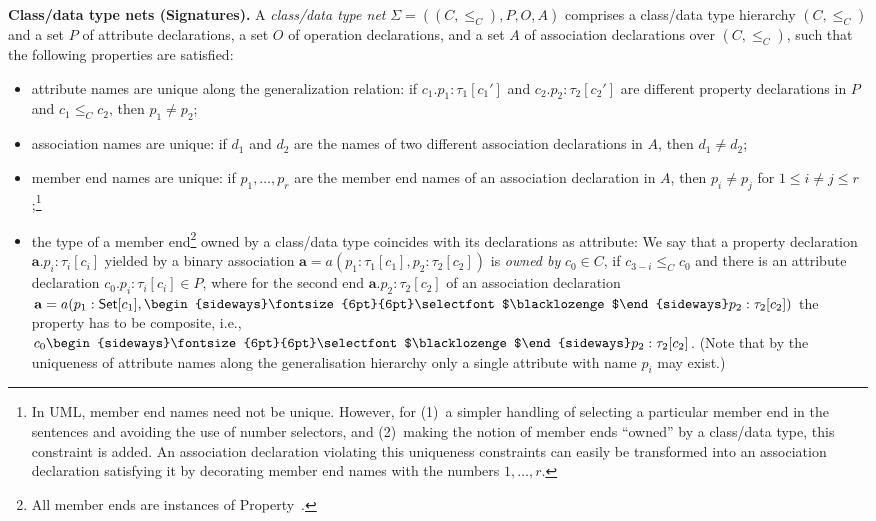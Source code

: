 \documentclass[10pt, a4paper]{isov2}
\newcommand{\uml}[1]{\textsf{#1}}
\newcommand{\composition}{\raisebox{0.2pt}{\begin{sideways}\fontsize{6pt}{6pt}\selectfont$\blacklozenge$\end{sideways}}}
\begin{document}
\medskip\noindent\textbf{Class/data type nets (Signatures).}
A \emph{class/data type net} $\Sigma = ((C, {\leq_C}), P, O, A)$
comprises a class/data type hierarchy $(C, {\leq_C})$ and a set $P$ of
attribute declarations, a set $O$ of operation declarations,
 and a set $A$ of association declarations over
$(C, {\leq_C})$, such that
the following properties are satisfied:
%
\begin{itemize}[label={--}, leftmargin=*]
  \item attribute names are unique along the generalization relation: if
$c_1.p_1 : \tau_1[c_1']$ and $c_2.p_2 : \tau_2[c_2']$ are different
property declarations in $P$ and $c_1 \leq_C c_2$, then $p_1 \neq
p_2$;

  \item association names are unique: if $d_1$
and $d_2$
are the names of two different association declarations in $A$,
then $d_1 \neq d_2$;

  \item member end names are unique: if $p_1, \ldots, p_r$
are the member end names of an association declaration in $A$,
then $p_i \neq p_j$
for $1 \leq i \neq j \leq r$;\footnote{In
  UML, member end names need not be unique.  However, for (1)~a simpler
  handling of selecting a particular member end in the sentences and
  avoiding the use of number selectors, and (2)~making the notion of
  member ends ``owned'' by a class/data type, this constraint is
  added. An association declaration violating this uniqueness
  constraints can easily be transformed into an association declaration
  satisfying it by decorating member end names with the numbers
  $1, \ldots, r$.}

  \item the type of a member end\footnote{All member ends are instances
  of \uml{Property}~\cite[p.~206]{uml-2.5}.}  owned by a class/data type
coincides with its declarations as attribute: We say that a property
declaration $\mathbf{a}.p_i : \tau_i[c_i]$
yielded by a binary association
$\mathbf{a} = a(p_1 : \tau_1[c_1], p_2 : \tau_2[c_2])$
is \emph{owned by} $c_0 \in C$,
if $c_{3-i} \leq_C c_0$
and there is an attribute declaration $c_0.p_i : \tau_i[c_i] \in P$,
where for the second end $\mathbf{a}.p_2 : \tau_2[c_2]$
of an association declaration
$\mathbf{a} = a(p_1 : \mathsf{Set}[c_1], \composition p_2 :
\tau_2[c_2])$ the property has to be composite, i.e.,
$c_0\composition p_2 : \tau_2[c_2]$.
(Note that by the uniqueness of attribute names along the generalisation
hierarchy only a single attribute with name $p_i$ may exist.)
\end{itemize}
\end{document}
